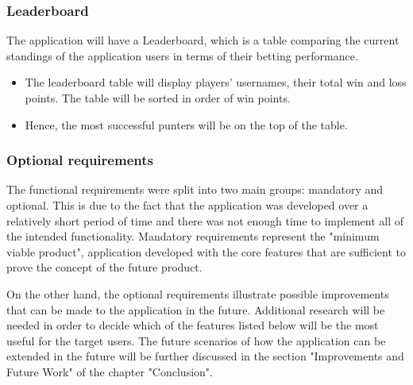 \subsubsection{Leaderboard}
\label{subsubsec:leaderboard_req}
The application will have a Leaderboard, which is a table comparing the current standings of the application users in terms of their betting performance.
\begin{itemize}
   \item The leaderboard table will display players' usernames, their total win and loss points. The table will be sorted in order of win points.    
	 \item Hence, the most successful punters will be on the top of the table.
\end{itemize}

\subsubsection{Optional requirements}
\label{sec:optional_req}
The functional requirements were split into two main groups: mandatory and optional. This is due to the fact that the application was developed over a relatively short period of time and there was not enough time to implement all of the intended functionality. Mandatory requirements represent the "minimum viable product", application developed with the core features that are sufficient to prove the concept of the future product.

On the other hand, the optional requirements illustrate possible improvements that can be made to the application in the future. Additional research will be needed in order to decide which of the features listed below will be the most useful for the target users. The future scenarios of how the application can be extended in the future will be further discussed in the section "Improvements and Future Work" of the chapter "Conclusion".

